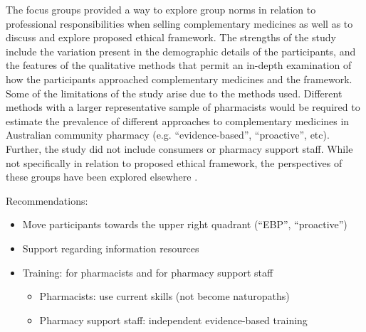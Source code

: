 \documentclass[11pt,a4paper]{article}
\providecommand{\tightlist}{%
  \setlength{\itemsep}{0pt}\setlength{\parskip}{0pt}}
\begin{document}
The focus groups provided a way to explore group norms in relation to
professional responsibilities when selling complementary medicines as
well as to discuss and explore proposed ethical framework. The strengths
of the study include the variation present in the demographic details of
the participants, and the features of the qualitative methods that
permit an in-depth examination of how the participants approached
complementary medicines and the framework. Some of the limitations of
the study arise due to the methods used. Different methods with a larger
representative sample of pharmacists would be required to estimate the
prevalence of different approaches to complementary medicines in
Australian community pharmacy (e.g. ``evidence-based'', ``proactive'',
etc). Further, the study did not include consumers or pharmacy support
staff. While not specifically in relation to proposed ethical framework,
the perspectives of these groups have been explored elsewhere
\autocite{Iyer2016a}.

Recommendations:

\begin{itemize}
\tightlist
\item
  Move participants towards the upper right quadrant (``EBP'',
  ``proactive'')
\item
  Support regarding information resources
\item
  Training: for pharmacists and for pharmacy support staff

  \begin{itemize}
  \tightlist
  \item
    Pharmacists: use current skills (not become naturopaths)
  \item
    Pharmacy support staff: independent evidence-based training
  \end{itemize}
\end{itemize}

\printbibliography[title=References]
\end{document}
